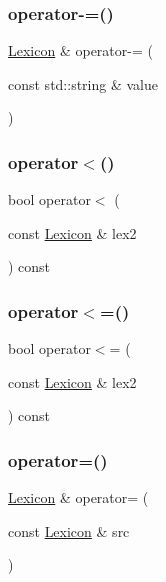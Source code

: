 \subsubsection{\texorpdfstring{operator-\/=()}{operator-=()}\hspace{0.1cm}{\footnotesize\ttfamily [3/3]}}
{\footnotesize\ttfamily \mbox{\hyperlink{classLexicon}{Lexicon}} \& operator-\/= (\begin{DoxyParamCaption}\item[{const std\+::string \&}]{value }\end{DoxyParamCaption})}

\mbox{\label{classLexicon_aad808851ca0fffc8b60fd0b69ad097bd}} 
\subsubsection{\texorpdfstring{operator$<$()}{operator<()}}
{\footnotesize\ttfamily bool operator$<$ (\begin{DoxyParamCaption}\item[{const \mbox{\hyperlink{classLexicon}{Lexicon}} \&}]{lex2 }\end{DoxyParamCaption}) const}

\mbox{\label{classLexicon_a236ec3f5ec721fb4ca4551bf49123eac}} 
\subsubsection{\texorpdfstring{operator$<$=()}{operator<=()}}
{\footnotesize\ttfamily bool operator$<$= (\begin{DoxyParamCaption}\item[{const \mbox{\hyperlink{classLexicon}{Lexicon}} \&}]{lex2 }\end{DoxyParamCaption}) const}

\mbox{\label{classLexicon_ab9766b3af1f48ed51a1bcf037e08de43}} 
\subsubsection{\texorpdfstring{operator=()}{operator=()}}
{\footnotesize\ttfamily \mbox{\hyperlink{classLexicon}{Lexicon}} \& operator= (\begin{DoxyParamCaption}\item[{const \mbox{\hyperlink{classLexicon}{Lexicon}} \&}]{src }\end{DoxyParamCaption})}

